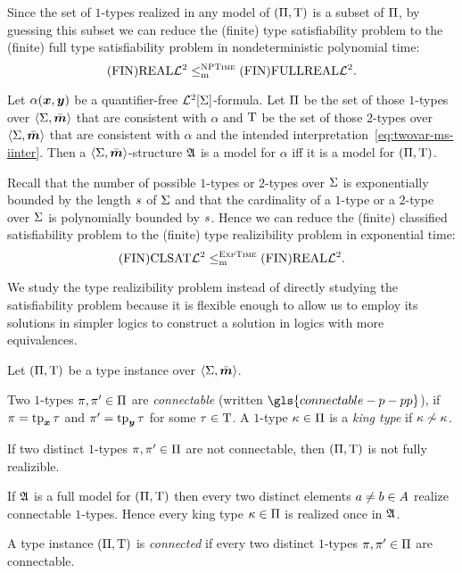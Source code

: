 \begin{remark}\label{rem:red-real-to-full-real}
Since the set of $1$-types realized in any model of $(\Pi,\mathrm{T})$ is a subset
of $\Pi$, by guessing this subset we can reduce the (finite) type
satisfiability problem to the (finite) full type satisfiability problem in
nondeterministic polynomial time:
\[
  \mathrm{(FIN)REAL}\mathcal{L}^{2} \leq_{\mathrm{m}}^{\text{\normalfont{\scshape NPTime}}} \mathrm{(FIN)FULLREAL}\mathcal{L}^{2}.
\]
\end{remark}

\begin{remark}\label{rem:red-sat-to-real}
Let $\alpha(\bm{x},\bm{y})$ be a quantifier-free $\mathcal{L}^{2}[\mathrm{\Sigma}]$-formula. Let $\Pi$ be
the set of those $1$-types over $\left\langle \mathrm{\Sigma},\bar{\bm{m}} \right\rangle$ that are consistent with
$\alpha$ and $\mathrm{T}$ be the set of those $2$-types over $\left\langle \mathrm{\Sigma},\bar{\bm{m}} \right\rangle$ that
are consistent with $\alpha$ and the intended
interpretation~\cref{eq:twovar-ms-iinter}. Then a $\left\langle \mathrm{\Sigma},\bar{\bm{m}} \right\rangle$-structure
$\mathfrak{A}$ is a model for $\alpha$ iff it is a model for $(\Pi,\mathrm{T})$.

Recall that the number of possible $1$-types or $2$-types over $\mathrm{\Sigma}$ is
exponentially bounded by the length $s$ of $\mathrm{\Sigma}$ and that the cardinality
of a $1$-type or a $2$-type over $\mathrm{\Sigma}$ is polynomially bounded by $s$.
Hence we can reduce the (finite) classified satisfiability problem to the
(finite) type realizibility problem in exponential time:
\[
  \mathrm{(FIN)CLSAT}\mathcal{L}^{2} \leq_{\mathrm{m}}^{\text{\normalfont{\scshape ExpTime}}} \mathrm{(FIN)REAL}\mathcal{L}^{2}.
\]
\end{remark}

We study the type realizibility problem instead of directly studying the
satisfiability problem because it is flexible enough to allow us to employ its
solutions in simpler logics to construct a solution in logics with more
equivalences.

Let $(\Pi,\mathrm{T})$ be a type instance over $\left\langle \mathrm{\Sigma},\bar{\bm{m}} \right\rangle$.
\begin{definition}\label{def:connectable}
Two $1$-types $\pi, {\pi'} \in \Pi$ are \emph{connectable} (written
$\gls{connectable-p-pp}$), if $\pi = \operatorname{tp}_{\bm{x}}\tau$ and ${\pi'} = \operatorname{tp}_{\bm{y}}\tau$ for
some $\tau \in \mathrm{T}$. A $1$-type $\kappa \in \Pi$ is a \emph{king type} if
$\kappa \not\sim \kappa$.
\end{definition}
\begin{remark}\label{rem:twovar-king-once}
If two distinct $1$-types $\pi, {\pi'} \in \Pi$ are not connectable, then
$(\Pi,\mathrm{T})$ is not fully realizible.

If $\mathfrak{A}$ is a full model for $(\Pi,\mathrm{T})$ then every two distinct elements
$a \neq b \in A$ realize connectable $1$-types. Hence every king type
$\kappa \in \Pi$ is realized once in $\mathfrak{A}$.

A type instance $(\Pi,\mathrm{T})$ is \emph{connected} if every two distinct
$1$-types $\pi, {\pi'} \in \Pi$ are connectable.
\end{remark}

